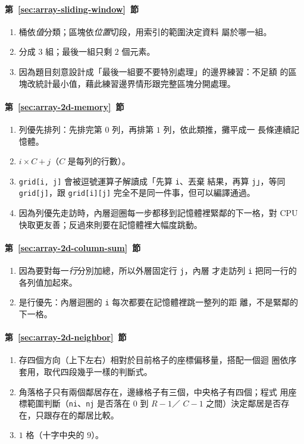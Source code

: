 \paragraph{第~\ref{sec:array-sliding-window}~節}
\begin{enumerate}
\item 桶依\emph{值}分類；區塊依\emph{位置}切段，用索引的範圍決定資料
屬於哪一組。
\item 分成 $3$ 組；最後一組只剩 $2$ 個元素。
\item 因為題目刻意設計成「最後一組要不要特別處理」的邊界練習：不足額
的區塊改統計最小值，藉此練習邊界情形跟完整區塊分開處理。
\end{enumerate}

\paragraph{第~\ref{sec:array-2d-memory}~節}
\begin{enumerate}
\item 列優先排列：先排完第 $0$ 列，再排第 $1$ 列，依此類推，攤平成一
長條連續記憶體。
\item $i \times C + j$（$C$ 是每列的行數）。
\item \texttt{grid[i, j]} 會被逗號運算子解讀成「先算 \texttt{i}、丟棄
結果，再算 \texttt{j}」，等同 \texttt{grid[j]}，跟 \texttt{grid[i][j]}
完全不是同一件事，但可以編譯通過。
\item 因為列優先走訪時，內層迴圈每一步都移到記憶體裡緊鄰的下一格，對
CPU 快取更友善；反過來則要在記憶體裡大幅度跳動。
\end{enumerate}

\paragraph{第~\ref{sec:array-2d-column-sum}~節}
\begin{enumerate}
\item 因為要對每一\emph{行}分別加總，所以外層固定行 \texttt{j}，內層
才走訪列 \texttt{i} 把同一行的各列值加起來。
\item 是行優先：內層迴圈的 \texttt{i} 每次都要在記憶體裡跳一整列的距
離，不是緊鄰的下一格。
\end{enumerate}

\paragraph{第~\ref{sec:array-2d-neighbor}~節}
\begin{enumerate}
\item 存四個方向（上下左右）相對於目前格子的座標偏移量，搭配一個迴
圈依序套用，取代四段幾乎一樣的判斷式。
\item 角落格子只有兩個鄰居存在，邊緣格子有三個，中央格子有四個；程式
用座標範圍判斷（\texttt{ni}、\texttt{nj} 是否落在 $0$ 到 $R-1$／
$C-1$ 之間）決定鄰居是否存在，只跟存在的鄰居比較。
\item $1$ 格（十字中央的 $9$）。
\end{enumerate}

